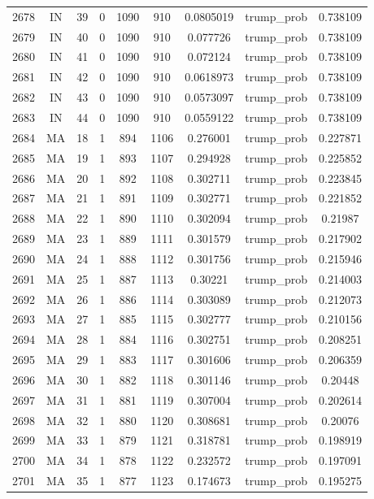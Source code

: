 \documentclass[12pt,a4paper]{article}
\begin{document}
\begin{tabular}{r|cccccccc}
	2678 & IN & 39 & 0 & 1090 & 910 & 0.0805019 & trump\_prob & 0.738109 \\
	2679 & IN & 40 & 0 & 1090 & 910 & 0.077726 & trump\_prob & 0.738109 \\
	2680 & IN & 41 & 0 & 1090 & 910 & 0.072124 & trump\_prob & 0.738109 \\
	2681 & IN & 42 & 0 & 1090 & 910 & 0.0618973 & trump\_prob & 0.738109 \\
	2682 & IN & 43 & 0 & 1090 & 910 & 0.0573097 & trump\_prob & 0.738109 \\
	2683 & IN & 44 & 0 & 1090 & 910 & 0.0559122 & trump\_prob & 0.738109 \\
	2684 & MA & 18 & 1 & 894 & 1106 & 0.276001 & trump\_prob & 0.227871 \\
	2685 & MA & 19 & 1 & 893 & 1107 & 0.294928 & trump\_prob & 0.225852 \\
	2686 & MA & 20 & 1 & 892 & 1108 & 0.302711 & trump\_prob & 0.223845 \\
	2687 & MA & 21 & 1 & 891 & 1109 & 0.302771 & trump\_prob & 0.221852 \\
	2688 & MA & 22 & 1 & 890 & 1110 & 0.302094 & trump\_prob & 0.21987 \\
	2689 & MA & 23 & 1 & 889 & 1111 & 0.301579 & trump\_prob & 0.217902 \\
	2690 & MA & 24 & 1 & 888 & 1112 & 0.301756 & trump\_prob & 0.215946 \\
	2691 & MA & 25 & 1 & 887 & 1113 & 0.30221 & trump\_prob & 0.214003 \\
	2692 & MA & 26 & 1 & 886 & 1114 & 0.303089 & trump\_prob & 0.212073 \\
	2693 & MA & 27 & 1 & 885 & 1115 & 0.302777 & trump\_prob & 0.210156 \\
	2694 & MA & 28 & 1 & 884 & 1116 & 0.302751 & trump\_prob & 0.208251 \\
	2695 & MA & 29 & 1 & 883 & 1117 & 0.301606 & trump\_prob & 0.206359 \\
	2696 & MA & 30 & 1 & 882 & 1118 & 0.301146 & trump\_prob & 0.20448 \\
	2697 & MA & 31 & 1 & 881 & 1119 & 0.307004 & trump\_prob & 0.202614 \\
	2698 & MA & 32 & 1 & 880 & 1120 & 0.308681 & trump\_prob & 0.20076 \\
	2699 & MA & 33 & 1 & 879 & 1121 & 0.318781 & trump\_prob & 0.198919 \\
	2700 & MA & 34 & 1 & 878 & 1122 & 0.232572 & trump\_prob & 0.197091 \\
	2701 & MA & 35 & 1 & 877 & 1123 & 0.174673 & trump\_prob & 0.195275 \\

\end{tabular}
\end{document}
